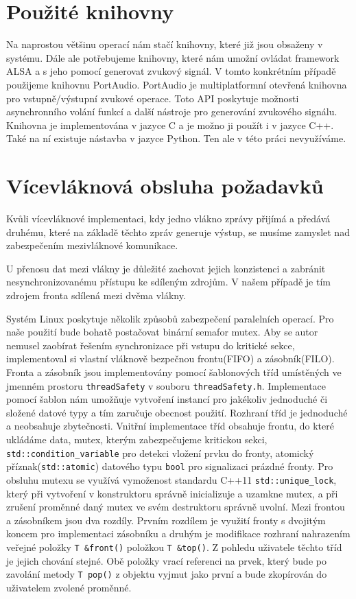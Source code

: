 	\section{Použité knihovny}
	Na naprostou většinu operací nám stačí knihovny, které již jsou obsaženy v systému. Dále ale potřebujeme knihovny, které nám umožní ovládat framework ALSA a s jeho pomocí generovat zvukový signál. V tomto konkrétním případě použijeme knihovnu PortAudio. PortAudio je multiplatformní otevřená knihovna pro vstupně/výstupní zvukové operace. Toto API poskytuje možnosti asynchronního volání funkcí a další nástroje pro generování zvukového signálu. Knihovna je implementována v jazyce C a je možno ji použít i v jazyce C++. Také na ní existuje nástavba v jazyce Python. Ten ale v této práci nevyužíváme.
	
	
	\section{Vícevláknová obsluha požadavků}
	Kvůli vícevláknové implementaci, kdy jedno vlákno zprávy přijímá a předává druhému, které na základě těchto zpráv generuje výstup, se musíme zamyslet nad zabezpečením mezivláknové komunikace.\par
	U přenosu dat mezi vlákny je důležité zachovat jejich konzistenci a zabránit nesynchronizovanému přístupu ke sdíleným zdrojům. V našem případě je tím zdrojem fronta sdílená mezi dvěma vlákny.\par
	Systém Linux poskytuje několik způsobů zabezpečení paralelních operací. Pro naše použití bude bohatě postačovat binární semafor mutex. Aby se autor nemusel zaobírat řešením synchronizace při vstupu do kritické sekce, implementoval si vlastní vláknově bezpečnou frontu(FIFO) a zásobník(FILO). Fronta a zásobník jsou implementovány pomocí šablonových tříd umístěných ve jmenném prostoru \texttt{threadSafety} v souboru \texttt{threadSafety.h}. Implementace pomocí šablon nám umožňuje vytvoření instancí pro jakékoliv jednoduché či složené datové typy a tím zaručuje obecnost použití. Rozhraní tříd je jednoduché a neobsahuje zbytečnosti. Vnitřní implementace tříd obsahuje frontu, do které ukládáme data, mutex, kterým zabezpečujeme kritickou sekci, \texttt{std::condition\_variable} pro detekci vložení prvku do fronty, atomický příznak(\texttt{std::atomic}) datového typu \texttt{bool} pro signalizaci prázdné fronty. Pro obsluhu mutexu se využívá vymoženost standardu C++11 \texttt{std::unique\_lock}, který při vytvoření v konstruktoru správně inicializuje a uzamkne mutex, a při zrušení proměnné daný mutex ve svém destruktoru správně uvolní. Mezi frontou a zásobníkem jsou dva rozdíly. Prvním rozdílem je využití fronty s dvojitým koncem pro implementaci zásobníku a druhým je modifikace rozhraní nahrazením veřejné položky \texttt{T \&front()} položkou \texttt{T \&top()}. Z pohledu uživatele těchto tříd je jejich chování stejné. Obě položky vrací referenci na prvek, který bude po zavolání metody \texttt{T pop()} z objektu vyjmut jako první a bude zkopírován do uživatelem zvolené proměnné.
 	
